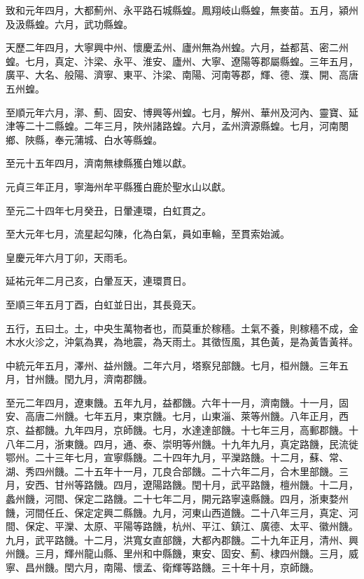 \begin{pinyinscope}
 致和元年四月，大都薊州、永平路石城縣蝗。鳳翔岐山縣蝗，無麥苗。五月，潁州及汲縣蝗。六月，武功縣蝗。



 天歷二年四月，大寧興中州、懷慶孟州、廬州無為州蝗。六月，益都莒、密二州蝗。七月，真定、汴梁、永平、淮安、廬州、大寧、遼陽等郡屬縣蝗。三年五月，廣平、大名、般陽、濟寧、東平、汴梁、南陽、河南等郡，輝、德、濮、開、高唐五州蝗。



 至順元年六月，漷、薊、固安、博興等州蝗。七月，解州、華州及河內、靈寶、延津等二十二縣蝗。二年三月，陜州諸路蝗。六月，孟州濟源縣蝗。七月，河南閿鄉、陜縣，奉元蒲城、白水等縣蝗。



 至元十五年四月，濟南無棣縣獲白雉以獻。



 元貞三年正月，寧海州牟平縣獲白鹿於聖水山以獻。



 至元二十四年七月癸丑，日暈連環，白虹貫之。



 至大元年七月，流星起勾陳，化為白氣，員如車輪，至貫索始滅。



 皇慶元年六月丁卯，天雨毛。



 延祐元年二月己亥，白暈亙天，連環貫日。



 至順三年五月丁酉，白虹並日出，其長竟天。



 五行，五曰土。土，中央生萬物者也，而莫重於稼穡。土氣不養，則稼穡不成，金木水火沴之，沖氣為異，為地震，為天雨土。其徵恆風，其色黃，是為黃眚黃祥。



 中統元年五月，澤州、益州饑。二年六月，塔察兒部饑。七月，桓州饑。三年五月，甘州饑。閏九月，濟南郡饑。



 至元二年四月，遼東饑。五年九月，益都饑。六年十一月，濟南饑。十一月，固安、高唐二州饑。七年五月，東京饑。七月，山東淄、萊等州饑。八年正月，西京、益都饑。九年四月，京師饑。七月，水達達部饑。十七年三月，高郵郡饑。十八年二月，浙東饑。四月，通、泰、崇明等州饑。十九年九月，真定路饑，民流徙鄂州。二十三年七月，宣寧縣饑。二十四年九月，平灤路饑。十二月，蘇、常、湖、秀四州饑。二十五年十一月，兀良合部饑。二十六年二月，合木里部饑。三月，安西、甘州等路饑。四月，遼陽路饑。閏十月，武平路饑，檀州饑。十二月，蠡州饑，河間、保定二路饑。二十七年二月，開元路寧遠縣饑。四月，浙東婺州饑，河間任丘、保定定興二縣饑。九月，河東山西道饑。二十八年三月，真定、河間、保定、平灤、太原、平陽等路饑，杭州、平江、鎮江、廣德、太平、徽州饑。九月，武平路饑。十二月，洪寬女直部饑，大都內郡饑。二十九年正月，清州、興州饑。三月，輝州龍山縣、里州和中縣饑，東安、固安、薊、棣四州饑。三月，威寧、昌州饑。閏六月，南陽、懷孟、衛輝等路饑。三十年十月，京師饑。




\end{pinyinscope}
